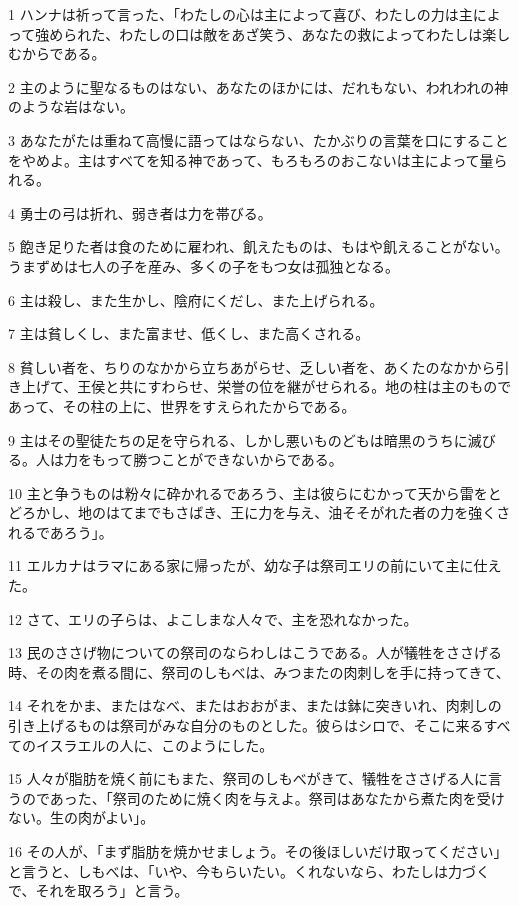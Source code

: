 \par 1 ハンナは祈って言った、「わたしの心は主によって喜び、わたしの力は主によって強められた、わたしの口は敵をあざ笑う、あなたの救によってわたしは楽しむからである。
\par 2 主のように聖なるものはない、あなたのほかには、だれもない、われわれの神のような岩はない。
\par 3 あなたがたは重ねて高慢に語ってはならない、たかぶりの言葉を口にすることをやめよ。主はすべてを知る神であって、もろもろのおこないは主によって量られる。
\par 4 勇士の弓は折れ、弱き者は力を帯びる。
\par 5 飽き足りた者は食のために雇われ、飢えたものは、もはや飢えることがない。うまずめは七人の子を産み、多くの子をもつ女は孤独となる。
\par 6 主は殺し、また生かし、陰府にくだし、また上げられる。
\par 7 主は貧しくし、また富ませ、低くし、また高くされる。
\par 8 貧しい者を、ちりのなかから立ちあがらせ、乏しい者を、あくたのなかから引き上げて、王侯と共にすわらせ、栄誉の位を継がせられる。地の柱は主のものであって、その柱の上に、世界をすえられたからである。
\par 9 主はその聖徒たちの足を守られる、しかし悪いものどもは暗黒のうちに滅びる。人は力をもって勝つことができないからである。
\par 10 主と争うものは粉々に砕かれるであろう、主は彼らにむかって天から雷をとどろかし、地のはてまでもさばき、王に力を与え、油そそがれた者の力を強くされるであろう」。
\par 11 エルカナはラマにある家に帰ったが、幼な子は祭司エリの前にいて主に仕えた。
\par 12 さて、エリの子らは、よこしまな人々で、主を恐れなかった。
\par 13 民のささげ物についての祭司のならわしはこうである。人が犠牲をささげる時、その肉を煮る間に、祭司のしもべは、みつまたの肉刺しを手に持ってきて、
\par 14 それをかま、またはなべ、またはおおがま、または鉢に突きいれ、肉刺しの引き上げるものは祭司がみな自分のものとした。彼らはシロで、そこに来るすべてのイスラエルの人に、このようにした。
\par 15 人々が脂肪を焼く前にもまた、祭司のしもべがきて、犠牲をささげる人に言うのであった、「祭司のために焼く肉を与えよ。祭司はあなたから煮た肉を受けない。生の肉がよい」。
\par 16 その人が、「まず脂肪を焼かせましょう。その後ほしいだけ取ってください」と言うと、しもべは、「いや、今もらいたい。くれないなら、わたしは力づくで、それを取ろう」と言う。

